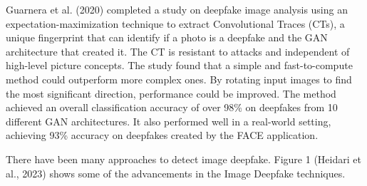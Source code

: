 Guarnera et al. (2020) \cite{guarnera2020fighting} completed a study on deepfake image analysis using an expectation-maximization technique to extract Convolutional Traces (CTs), a unique fingerprint that can identify if a photo is a deepfake and the GAN architecture that created it. The CT is resistant to attacks and independent of high-level picture concepts. The study found that a simple and fast-to-compute method could outperform more complex ones. By rotating input images to find the most significant direction, performance could be improved. The method achieved an overall classification accuracy of over 98\% on deepfakes from 10 different GAN architectures. It also performed well in a real-world setting, achieving 93\% accuracy on deepfakes created by the FACE application.

 
There have been many approaches to detect image deepfake. Figure 1 (Heidari et al., 2023) \cite{heidari2023deepfake}  shows some of the advancements in the Image Deepfake techniques.

